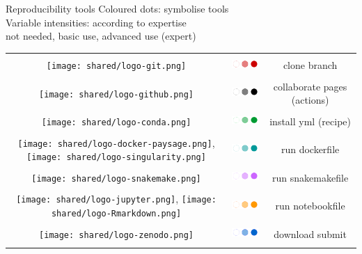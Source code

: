 \begin{frame}{Reproducibility tools}
Coloured dots: symbolise tools \\
Variable intensities: according to expertise\\
not needed, basic use, advanced use (expert)
\begin{center}
\begin{tabular}{|c|c|c|}
   \hline
   \texttt{[image: shared/logo-git.png]} & \includegraphics[height=0.7cm]{10_usecases/images/FAIR_dots_git.png} & clone branch \\
   \texttt{[image: shared/logo-github.png]} & \includegraphics[height=0.7cm]{10_usecases/images/FAIR_dots_github.png} & collaborate pages (actions)\\
   \texttt{[image: shared/logo-conda.png]} & \includegraphics[height=0.7cm]{10_usecases/images/FAIR_dots_conda.png} & install yml (recipe)\\
   \texttt{[image: shared/logo-docker-paysage.png]}, \texttt{[image: shared/logo-singularity.png]} & \includegraphics[height=0.7cm]{10_usecases/images/FAIR_dots_docker.png} & run dockerfile\\
   \texttt{[image: shared/logo-snakemake.png]} & \includegraphics[height=0.7cm]{10_usecases/images/FAIR_dots_smk.png} & run snakemakefile\\
   \texttt{[image: shared/logo-jupyter.png]}, \texttt{[image: shared/logo-Rmarkdown.png]} & \includegraphics[height=0.7cm]{10_usecases/images/FAIR_dots_jupyter.png} & run notebookfile \\
   \texttt{[image: shared/logo-zenodo.png]} & \includegraphics[height=0.7cm]{10_usecases/images/FAIR_dots_zenodo.png} & download submit\\
   \hline
\end{tabular}
\end{center}
\end{frame}
